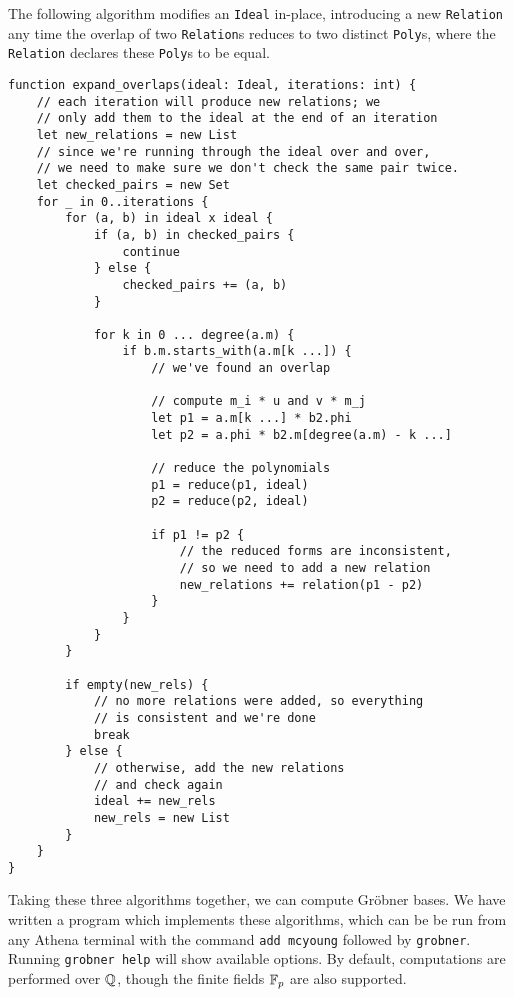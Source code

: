\begin{subalg}
    The following algorithm modifies an \verb|Ideal| in-place, introducing a new
    \verb|Relation| any time the overlap of two \verb|Relation|s reduces to two
    distinct \verb|Poly|s, where the \verb|Relation| declares these \verb|Poly|s to
    be equal.
\begin{verbatim}
function expand_overlaps(ideal: Ideal, iterations: int) {
    // each iteration will produce new relations; we 
    // only add them to the ideal at the end of an iteration
    let new_relations = new List
    // since we're running through the ideal over and over,
    // we need to make sure we don't check the same pair twice.
    let checked_pairs = new Set
    for _ in 0..iterations {
        for (a, b) in ideal x ideal {
            if (a, b) in checked_pairs {
                continue
            } else {
                checked_pairs += (a, b)
            }
            
            for k in 0 ... degree(a.m) {
                if b.m.starts_with(a.m[k ...]) {
                    // we've found an overlap
                    
                    // compute m_i * u and v * m_j
                    let p1 = a.m[k ...] * b2.phi
                    let p2 = a.phi * b2.m[degree(a.m) - k ...]
                    
                    // reduce the polynomials
                    p1 = reduce(p1, ideal)
                    p2 = reduce(p2, ideal)
                    
                    if p1 != p2 {
                        // the reduced forms are inconsistent, 
                        // so we need to add a new relation
                        new_relations += relation(p1 - p2)
                    }
                }
            }
        }
        
        if empty(new_rels) {
            // no more relations were added, so everything
            // is consistent and we're done
            break
        } else {
            // otherwise, add the new relations
            // and check again
            ideal += new_rels
            new_rels = new List
        }
    }
}
\end{verbatim}
\end{subalg}

Taking these three algorithms together, we can compute Gr\"obner bases. We have written
a program which implements these algorithms, which can be be run from any Athena
terminal with the command \verb|add mcyoung| followed by \verb|grobner|. Running
\verb|grobner help| will show available options. By default, computations are performed
over $\mathbb{Q}$, though the finite fields $\mathbb{F}_p$ are also supported.

